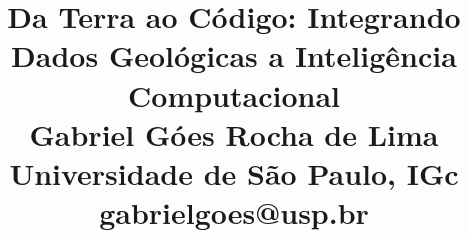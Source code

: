 \documentclass[11pt]{article} %
\begin{document}
\title{
    \vspace*{1.5cm}
    \small \textbf{Da Terra ao Código: Integrando Dados Geológicas a Inteligência Computacional}\\
    \vspace{0.25cm}
    \small Gabriel Góes Rocha de Lima\\
    \vspace{0.25cm}
    \small Universidade de São Paulo, IGc\\
    \vspace{0.25cm}
    \small gabrielgoes@usp.br
    
}
\date{}
\maketitle

\newcommand{\italic}[1]{\textit{#1}}

\vspace{-2.0cm}
\end{document}
